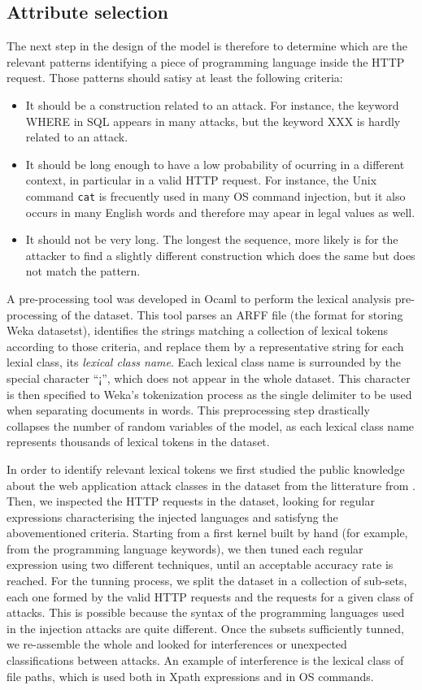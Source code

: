 \documentclass[runningheads,a4paper]{llncs}
\begin{document}
\subsection{Attribute selection}

The next step in the design of the model is therefore to determine which are the relevant patterns identifying a piece of programming language inside the HTTP request. Those patterns should satisy at least the following criteria: 
\begin{itemize}
\item It should be a construction related to an attack. For instance, the keyword WHERE in SQL appears in many attacks, but the keyword XXX is hardly related to an attack.
\item It should be long enough to have a low probability of ocurring in a different context, in particular in a valid HTTP request. For instance, the Unix command \texttt{cat} is frecuently used in many OS command injection, but it also occurs in many English words and therefore may apear in legal values as well.
\item It should not be very long. The longest the sequence, more likely is for the attacker to find a slightly different construction which does the same but does not match the pattern.
\end{itemize}

A pre-processing tool was developed in Ocaml to perform the lexical analysis pre-processing of the dataset. This tool parses an ARFF file (the format for storing Weka datasetst), identifies the strings matching a collection of lexical tokens according to those criteria, and replace them by a representative string for each lexial class, its \textit{lexical class name}. Each lexical class name is surrounded by the special character ``¡'', which does not appear in the whole dataset. This character is then specified to Weka's tokenization process as the single delimiter to be used when separating documents in words. This preprocessing step drastically collapses the number of random variables of the model, as each lexical class name represents thousands of lexical tokens in the dataset. 

In order to identify relevant lexical tokens we first studied the public knowledge about the web application attack classes in the dataset from the litterature from \cite{OWASP}. Then, we inspected the HTTP requests  in the dataset, looking for regular expressions characterising the injected languages and satisfyng the abovementioned criteria. Starting from a first kernel built by hand (for example, from the programming language keywords), we then tuned each regular expression using two different techniques, until an acceptable accuracy rate is reached. For the tunning process, we split the dataset in a collection of sub-sets, each one formed by the valid HTTP requests and the requests for a given class of attacks. This is possible because the syntax of the programming languages used in the injection attacks are quite different. Once the subsets sufficiently tunned, we re-assemble the whole and looked for interferences or unexpected classifications between attacks. An example of interference is the lexical class of file paths, which is used both in Xpath expressions and in OS commands.
\end{document}
